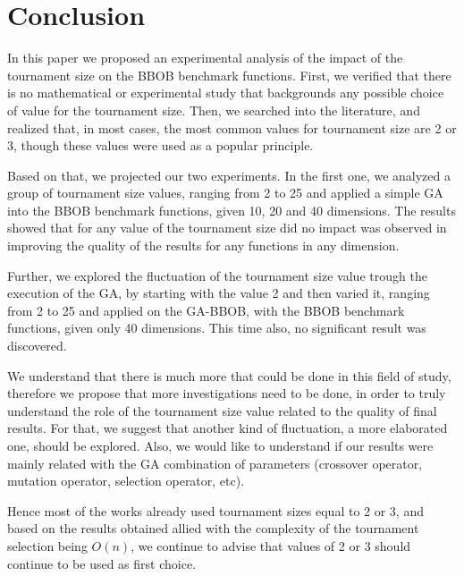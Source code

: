 \section{Conclusion}
\label{sec:conclusion}


In this paper we proposed an experimental analysis of the impact of the tournament size on the BBOB benchmark functions. First, we verified that there is no mathematical or experimental study that backgrounds any possible choice of value for the tournament size. Then, we searched into the literature, and realized that, in most cases, the most common values for tournament size are 2 or 3, though these values were used as a popular principle. 

 
 
Based on that, we projected our two experiments. In the first one, we analyzed a group of tournament size values, ranging from 2 to 25 and applied a simple GA into the BBOB benchmark functions, given 10, 20 and 40 dimensions. The results showed that for any value of the tournament size did no impact was observed in improving the quality of the results for any functions in any dimension.

Further, we explored the fluctuation of the tournament size value trough the execution of the GA, by starting with the value 2 and then varied it, ranging from 2 to 25 and applied on the GA-BBOB, with the BBOB benchmark functions, given only 40 dimensions. This time also, no significant result was discovered.

We understand that there is much more that could be done in this field of study, therefore we propose that more investigations need to be done, in order to truly understand the role of the tournament size value related to the quality of final results. For that, we suggest that another kind of fluctuation, a more elaborated one, should be explored. Also, we would like to understand if our results were mainly related with the GA combination of parameters (crossover operator, mutation operator, selection operator, etc).

Hence most of the works already used tournament sizes equal to 2 or 3, and based on the results obtained allied with the complexity of the tournament selection being $O(n)$, we continue to advise that values of 2 or 3 should continue to be used as first choice.
